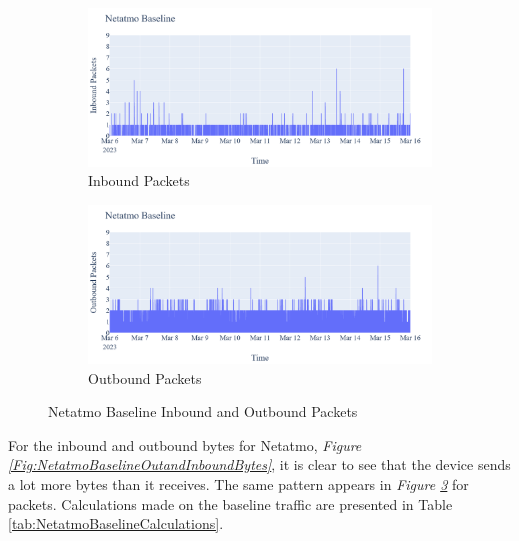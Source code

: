 \begin{figure}[H]
    \centering
    \begin{subfigure}[b]{0.7\textwidth}
        \includegraphics[width=\textwidth]{figures/Netatmo_Baseline_InboundPackets.png}
        \caption{Inbound Packets}
        \label{fig:NetatmoBaselineInboundPackets}
    \end{subfigure}
    \begin{subfigure}[b]{0.7\textwidth}
        \includegraphics[width=\textwidth]{figures/Netatmo_Baseline_OutboundPackets.png}
        \caption{Outbound Packets}
        \label{fig:NetatmoBaselineOutboundPackets}
    \end{subfigure}
    \caption{Netatmo Baseline Inbound and Outbound Packets}
    \label{Fig:NetatmoBaselineOutandInboundPackets}
 \end{figure}
For the inbound and outbound bytes for Netatmo, \textit{Figure \ref{Fig:NetatmoBaselineOutandInboundBytes}}, it is clear to see that the device sends a lot more bytes than it receives. The same pattern appears in \textit{Figure \ref{Fig:NetatmoBaselineOutandInboundPackets}} for packets. Calculations made on the baseline traffic are presented in Table \ref{tab:NetatmoBaselineCalculations}. 
